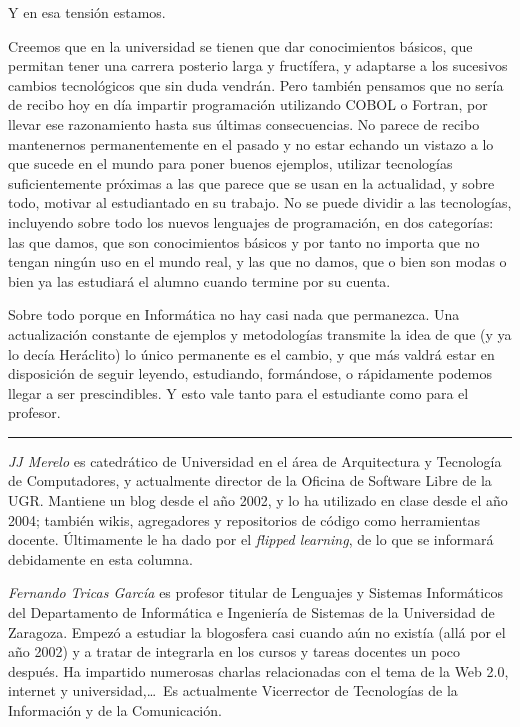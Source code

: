 \documentclass[twoside,10pt]{article}
\newcounter{num}
\begin{document}
\begin{multicols}{2}
Y en esa tensión estamos.

Creemos que en la universidad se tienen que dar conocimientos básicos,
que permitan tener una carrera posterio larga y fructífera, y
adaptarse a los sucesivos cambios tecnológicos que sin duda vendrán. 
	Pero también pensamos que no sería de recibo hoy en día
        impartir programación utilizando COBOL o Fortran, por llevar
        ese razonamiento hasta sus últimas consecuencias. No parece de
        recibo mantenernos permanentemente en el pasado y no estar
        echando un vistazo a lo que sucede en el mundo para poner
        buenos ejemplos, utilizar tecnologías suficientemente próximas
        a las que parece que se usan en la actualidad, y sobre todo,
        motivar al estudiantado en su trabajo. No se puede dividir a
        las tecnologías, incluyendo sobre todo los nuevos lenguajes de
        programación, en dos categorías: las que damos, que son
        conocimientos básicos y por tanto no importa que no tengan
        ningún uso en el mundo real, y las que no damos, que o bien
        son modas o bien ya las estudiará el alumno cuando termine por
        su cuenta. 

Sobre todo porque en Informática no hay casi nada que permanezca. Una
actualización constante de ejemplos y metodologías transmite la idea
de que (y ya lo decía Heráclito) lo único permanente es el cambio, y
que más valdrá estar en disposición de seguir leyendo, estudiando,
formándose, o rápidamente podemos llegar a ser prescindibles.  Y esto
vale tanto para el estudiante como para el profesor. 

\noindent\rule{86mm}{1pt}
\vspace{1ex} {\small{\begin{window} 
\noindent\emph{JJ Merelo} es catedrático de Universidad
en el área de Arquitectura y Tecnología de Computadores, y
actualmente director de la Oficina de Software Libre de la UGR.
Mantiene un blog desde el año 2002, y lo ha utilizado en clase desde
el año 2004; también wikis, agregadores y repositorios de código
como herramientas docente. Últimamente le ha dado por el \textsl{flipped
learning}, de lo que se informará debidamente en esta columna.
\end{window}}}

\medskip

{\small{\begin{window}
		\noindent \emph{Fernando Tricas García} es profesor
		titular de Lenguajes y Sistemas Informáticos del Departamento
		de Informática e Ingeniería de Sistemas de la Universidad de
		Zaragoza.  Empezó a estudiar la blogosfera casi cuando aún no
		existía (allá por el año 2002) y a tratar de integrarla en los
		cursos y tareas docentes un poco después.  Ha impartido
		numerosas charlas relacionadas con el tema de la Web 2.0, 
		internet y universidad,\ldots\ 
		Es actualmente Vicerrector de Tecnologías de la Información y
de la Comunicación.   
		\end{window}}}





\end{multicols}
\end{document}

